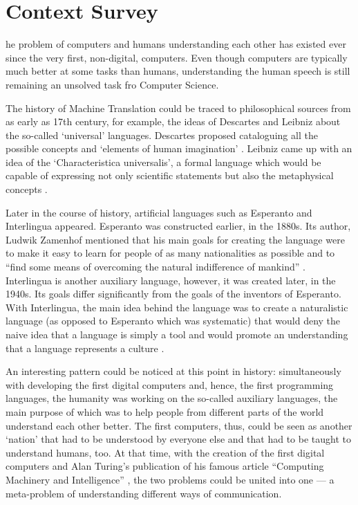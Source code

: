 \let\textcircled=\pgftextcircled
\chapter{Context Survey}
\label{chap:context-survey}

he problem of computers and humans understanding each other has existed ever since the very first, non-digital, computers. Even though computers are typically much better at some tasks than humans, understanding the human speech is still remaining an unsolved task fro Computer Science. 

The history of Machine Translation could be traced to philosophical sources from as early as 17th century, for example, the ideas of Descartes and Leibniz about the so-called `universal' languages. Descartes proposed cataloguing all the possible concepts and `elements of human imagination' \cite{descartes}. Leibniz came up with an idea of the `Characteristica universalis', a formal language which would be capable of expressing not only scientific statements but also the metaphysical concepts \cite{leibniz}. 

Later in the course of history, artificial languages such as Esperanto and Interlingua appeared. Esperanto was constructed earlier, in the 1880s. Its author, Ludwik Zamenhof mentioned that his main goals for creating the language were to make it easy to learn for people of as many nationalities as possible and to ``find some means of overcoming the natural indifference of mankind'' \cite{zamenhof1911international}. Interlingua is another auxiliary language, however, it was created later, in the 1940s. Its goals differ significantly from the goals of the inventors of Esperanto. With Interlingua, the main idea behind the language was to create a naturalistic language (as opposed to Esperanto which was systematic) that would deny the naive idea that a language is simply a tool and would promote an understanding that a language represents a culture \cite{gode1951interlingua}.

An interesting pattern could be noticed at this point in history: simultaneously with developing the first digital computers and, hence, the first programming languages, the humanity was working on the so-called auxiliary languages, the main purpose of which was to help people from different parts of the world understand each other better. The first computers, thus, could be seen as another `nation' that had to be understood by everyone else and that had to be taught to understand humans, too. At that time, with the creation of the first digital computers and Alan Turing's publication of his famous article ``Computing Machinery and Intelligence'' \cite{turing1950computing}, the two problems could be united into one --- a meta-problem of understanding different ways of communication.

